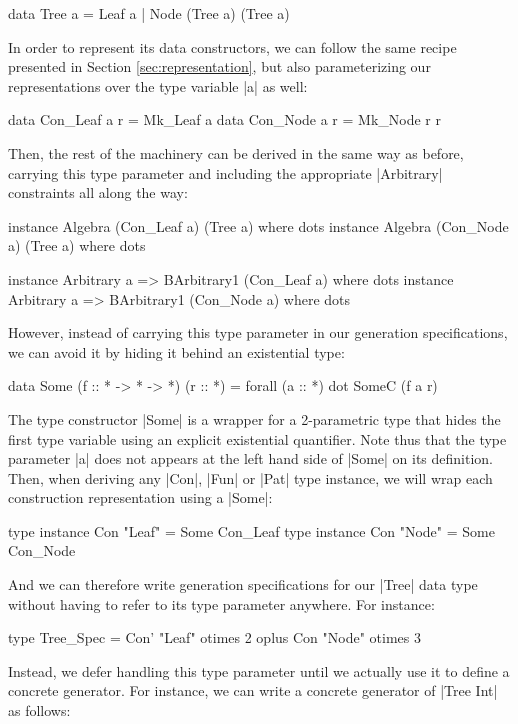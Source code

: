 \begin{code}
data Tree a = Leaf a | Node (Tree a) (Tree a)
\end{code}

In order to represent its data constructors, we can follow the same recipe
presented in Section \ref{sec:representation}, but also parameterizing our
representations over the type variable |a| as well:

\begin{code}
data Con_Leaf a r = Mk_Leaf a
data Con_Node a r = Mk_Node r r
\end{code}

Then, the rest of the machinery can be derived in the same way as before,
carrying this type parameter and including the appropriate |Arbitrary|
constraints all along the way:

\begin{code}
instance Algebra (Con_Leaf a) (Tree a) where dots
instance Algebra (Con_Node a) (Tree a) where dots

instance Arbitrary a => BArbitrary1 (Con_Leaf a) where dots
instance Arbitrary a => BArbitrary1 (Con_Node a) where dots
\end{code}

%
However, instead of carrying this type parameter in our generation
specifications, we can avoid it by hiding it behind an existential type:

\begin{code}
data Some (f :: * -> * -> *) (r :: *) = forall (a :: *) dot SomeC (f a r)
\end{code}
%
The type constructor |Some| is a wrapper for a 2-parametric type that hides the
first type variable using an explicit existential quantifier.
%
Note thus that the type parameter |a| does not appears at the left hand side of
|Some| on its definition.
%
Then, when deriving any |Con|, |Fun| or |Pat| type instance, we will wrap each
construction representation using a |Some|:

\begin{code}
type instance Con "Leaf" = Some Con_Leaf
type instance Con "Node" = Some Con_Node
\end{code}

And we can therefore write generation specifications for our |Tree| data type
without having to refer to its type parameter anywhere.
%
For instance:

\begin{code}
type Tree_Spec  =      Con'  "Leaf"  otimes 2
                oplus  Con   "Node"  otimes 3
\end{code}
%
Instead, we defer handling this type parameter until we actually use it to
define a concrete generator.
%
For instance, we can write a concrete generator of |Tree Int| as follows:


